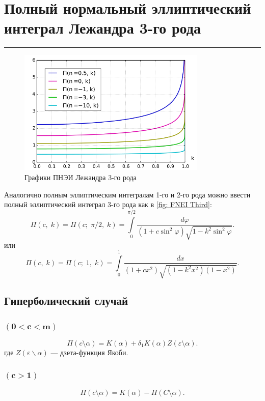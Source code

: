 \documentclass[fleqn]{article}
\begin{document}
	\section{Полный нормальный эллиптический интеграл Лежандра 3-го рода}
	\hrule
	\begin{figure}[h]
		\centering
	\includegraphics[width=0.8\textwidth]{Graphs/ThirdMulti.png}
	\caption{Графики ПНЭИ Лежандра 3-го рода}
	\label{fig: FNEI Third}
	\end{figure}
	Аналогично полным эллиптическим интегралам 1-го и 2-го рода можно ввести полный эллиптический интеграл 3-го рода как в \eqref{fig: FNEI Third}:
	\begin{equation*}\Pi (c,\;k)=\Pi (c;\;\pi /2,\;k)=\int \limits _{0}^{\pi /2}\!{\frac {d\varphi }{(1+c\sin ^{2}\varphi ){\sqrt {1-k^{2}\sin ^{2}\varphi }}}}.\end{equation*}
	или
	\begin{equation*}\Pi (c,\;k)=\Pi (c;\;1,\;k)=\int \limits _{0}^{1}\!{\frac {dx}{(1+cx^{2}){\sqrt {(1-k^{2}x^{2})(1-x^{2})}}}}.\end{equation*}
	\subsection{Гиперболический случай}
	\subsubsection{$\mathbf{(0<c<m)}$}
	\begin{equation*}\Pi(c \setminus \alpha) = K(\alpha) + \delta_1K(\alpha)Z(\varepsilon \setminus \alpha).\end{equation*}
	где $Z(\varepsilon\backslash\alpha)$ --- дзета-функция Якоби.
	\subsubsection{$\mathbf{(c>1)}$}
	\begin{equation*}\Pi (c\setminus \alpha )=K(\alpha )-\Pi (C\setminus \alpha ).\end{equation*}
\end{document}
